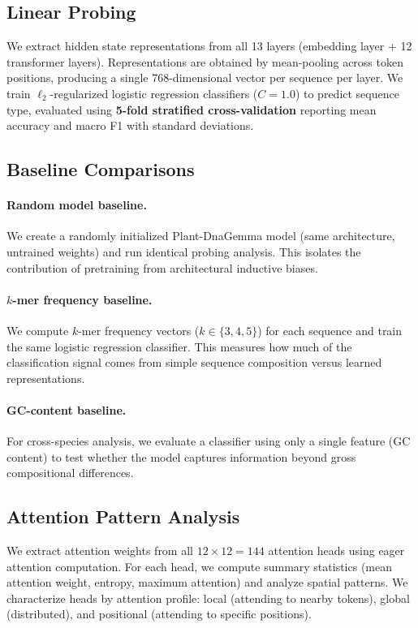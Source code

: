 \documentclass{article}
\begin{document}
\subsection{Linear Probing}

We extract hidden state representations from all 13 layers (embedding layer + 12 transformer layers). Representations are obtained by mean-pooling across token positions, producing a single 768-dimensional vector per sequence per layer. We train $\ell_2$-regularized logistic regression classifiers ($C=1.0$) to predict sequence type, evaluated using \textbf{5-fold stratified cross-validation} reporting mean accuracy and macro F1 with standard deviations.

\subsection{Baseline Comparisons}

\paragraph{Random model baseline.} We create a randomly initialized Plant-DnaGemma model (same architecture, untrained weights) and run identical probing analysis. This isolates the contribution of pretraining from architectural inductive biases.

\paragraph{$k$-mer frequency baseline.} We compute $k$-mer frequency vectors ($k \in \{3,4,5\}$) for each sequence and train the same logistic regression classifier. This measures how much of the classification signal comes from simple sequence composition versus learned representations.

\paragraph{GC-content baseline.} For cross-species analysis, we evaluate a classifier using only a single feature (GC content) to test whether the model captures information beyond gross compositional differences.

\subsection{Attention Pattern Analysis}

We extract attention weights from all $12 \times 12 = 144$ attention heads using eager attention computation. For each head, we compute summary statistics (mean attention weight, entropy, maximum attention) and analyze spatial patterns. We characterize heads by attention profile: local (attending to nearby tokens), global (distributed), and positional (attending to specific positions).
\end{document}
